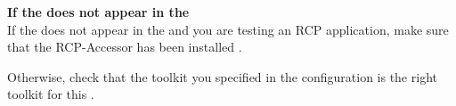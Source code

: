 \textbf{If the \gdaut{} does not appear in the \gdrunautview{}}\\
If the \gdaut{} does not appear in the \gdrunautview{} and you are testing an RCP application, make sure that the RCP-Accessor has been installed . 

Otherwise, check that the toolkit you specified in the \gdaut{} configuration  is the right toolkit for this \gdaut{}. 


